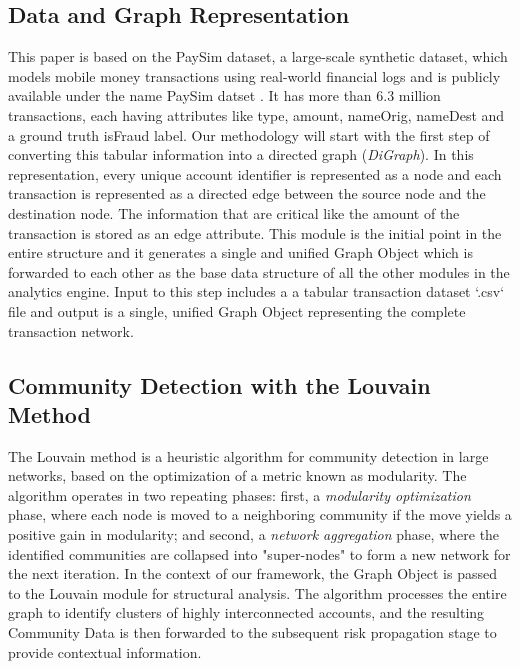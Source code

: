 \documentclass[lettersize,journal]{IEEEtran}
\begin{document}
\subsection{Data and Graph Representation}
This paper is based on the PaySim dataset, a large-scale synthetic dataset, which models mobile money transactions using real-world financial logs and is publicly available under the name PaySim datset \cite{paysim2016}. It has more than 6.3 million transactions, each having attributes like type, amount, nameOrig, nameDest and a ground truth isFraud label. Our methodology will start with the first step of converting this tabular information into a directed graph (\textit{DiGraph}). In this representation, every unique account identifier is represented as a node and each transaction is represented as a directed edge between the source node and the destination node. The information that are critical like the amount of the transaction is stored as an edge attribute. This module is the initial point in the entire structure and it generates a single and unified Graph Object which is forwarded to each other as the base data structure of all the other modules in the analytics engine. Input to this step includes a a tabular transaction dataset `.csv` file and output is a single, unified Graph Object representing the complete transaction network.


\subsection{Community Detection with the Louvain Method}
The Louvain method is a heuristic algorithm for community detection in large networks, based on the optimization of a metric known as modularity. The algorithm operates in two repeating phases: first, a \textit{modularity optimization} phase, where each node is moved to a neighboring community if the move yields a positive gain in modularity; and second, a \textit{network aggregation} phase, where the identified communities are collapsed into "super-nodes" to form a new network for the next iteration. In the context of our framework, the Graph Object is passed to the Louvain module for structural analysis. The algorithm processes the entire graph to identify clusters of highly interconnected accounts, and the resulting Community Data is then forwarded to the subsequent risk propagation stage to provide contextual information.
\end{document}

